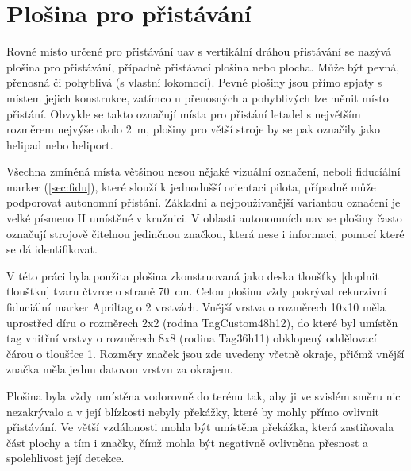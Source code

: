 \chapter{Plošina pro přistávání}
  Rovné místo určené pro přistávání \acrshort{uav} s vertikální dráhou přistávání se nazývá plošina pro přistávání, případně přistávací plošina nebo plocha. Může být pevná, přenosná či pohyblivá (s vlastní lokomocí). Pevné plošiny jsou přímo spjaty s místem jejich konstrukce, zatímco u přenosných a pohyblivých lze měnit místo přistání. Obvykle se takto označují místa pro přistání letadel s největším rozměrem nejvýše okolo 2~m, plošiny pro větší stroje by se pak označily jako helipad nebo heliport.

  Všechna zmíněná místa většinou nesou nějaké vizuální označení, neboli fiducíální marker (\cref{sec:fidu}), které slouží k jednodušší orientaci pilota, případně může podporovat autonomní přistání. Základní a nejpoužívanější variantou označení je velké písmeno H umístěné v kružnici. V oblasti autonomních \acrshort{uav} se plošiny často označují strojově čitelnou jedinčnou značkou, která nese i informaci, pomocí které se dá identifikovat.

  V této práci byla použita plošina zkonstruovaná jako deska tloušťky [doplnit tloušťku] tvaru čtvrce o straně 70~cm. Celou plošinu vždy pokrýval rekurzivní fiduciální marker Apriltag o 2 vrstvách. Vnější vrstva o rozměrech 10x10 měla uprostřed díru o rozměrech 2x2 (rodina TagCustom48h12), do které byl umístěn tag vnitřní vrstvy o rozměrech 8x8 (rodina Tag36h11) obklopený oddělovací čárou o tloušťce 1. Rozměry značek jsou zde uvedeny včetně okraje, přičmž vnější značka měla jednu datovou vrstvu za okrajem.
  
  Plošina byla vždy umístěna vodorovně do terénu tak, aby ji ve svislém směru nic nezakrývalo a v její blízkosti nebyly překážky, které by mohly přímo ovlivnit přistávání. Ve větší vzdálonosti mohla být umístěna překážka, která zastiňovala část plochy a tím i značky, čímž mohla být negativně ovlivněna přesnost a spolehlivost její detekce.
